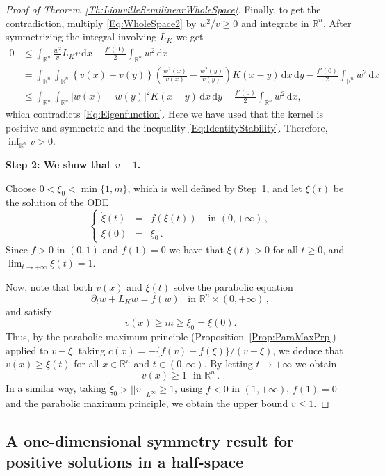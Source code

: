 \documentclass[12pt,reqno]{amsart}
\theoremstyle{definition}
\theoremstyle{remark}
\newcommand{\con}[1]{\mathbb{#1}}
\newcommand{\R}{\con{R}} %
\newcommand{\norm}[1]{\left | \left |{#1} \right | \right |}
\renewcommand{\d}{\,\mathrm{d}} %
\newcommand\beqc[1]{\left\{\begin{array}{#1}}
\newcommand\eeqc{\end{array} \right.}
\def\PDEsystem{rcll}
\def\ds{\displaystyle}
\numberwithin{equation}{section}
\begin{document}
\begin{proof}[Proof of Theorem~\ref{Th:LiouvilleSemilinearWholeSpace}]
	Finally, to get the contradiction, multiply \eqref{Eq:WholeSpace2} by $w^2/v\geq 0$ and integrate in $\R^n$. After symmetrizing the integral involving $L_K$ we get
	\begin{align*}
	0 &\leq \int_{\R^n} \frac{w^2}{v}  L_K v \d x - \frac{f'(0)}{2}\int_{\R^n} w^2 \d x \\
	&= \int_{\R^n}\int_{\R^n}\left\{ v(x)-v(y) \right\} \left( \frac{w^2(x)}{v(x)}-\frac{w^2(y)}{v(y)} \right) K(x-y) \d x \d y - \frac{f'(0)}{2}\int_{\R^n} w^2 \d x \\
	&\leq \int_{\R^n}\int_{\R^n} |w(x)-w(y)|^2 K(x-y) \d x \d y - \frac{f'(0)}{2}\int_{\R^n} w^2 \d x ,
	\end{align*}
	which contradicts \eqref{Eq:Eigenfunction}. Here we have used that the kernel is positive and symmetric and the inequality \eqref{Eq:IdentityStability}. Therefore, $\inf_{\R^n} v >0$.
	
	\textbf{Step 2: We show that $v\equiv 1$.}
	
	Choose $0<\xi_0<\min\{1,m\}$, which is well defined by Step~1, and let $\xi(t)$ be the solution of the ODE
	$$
	\beqc{\PDEsystem}
	\dot{\xi}(t) &=& f(\xi(t)) & \textrm{ in }(0,+\infty)\,,\\
	\xi(0) &=& \xi_0\,.
	\eeqc
	$$
	Since $f>0$ in $(0,1)$ and $f(1) = 0$ we have that $\dot{\xi}(t)>0$ for all $t\geq 0$, and $\ds \lim_{t\to +\infty} \xi(t) = 1$.
	
	Now, note that both $v(x)$ and $\xi(t)$ solve the parabolic equation
	$$ \partial_t w + L_K w = f(w) \,\,\, \textrm{ in }\R^n\times (0,+\infty)\,, $$
	and satisfy
	$$ v(x) \geq m \geq \xi_0 = \xi(0). $$
	Thus, by the parabolic maximum principle (Proposition~\ref{Prop:ParaMaxPrp}) applied to $v-\xi$, taking $c(x) = -\{f(v)-f(\xi)\}/(v-\xi)$, we deduce that $v(x)\geq \xi(t)$ for all $x\in\R^n$ and $t\in(0,\infty)$. By letting $t \to +\infty$ we obtain
	$$
	v(x) \geq 1 \,\, \textrm{ in }\R^n\,.  
	$$
	In a similar way, taking $\tilde{\xi}_0>\norm{v}_{L^\infty} \geq 1$, using $f<0$ in $(1,+\infty)$, $f(1)=0$ and the parabolic maximum principle, we obtain the upper bound $v\leq 1$.
\end{proof}



\subsection{A one-dimensional symmetry result for positive solutions in a half-space}
\end{document}
